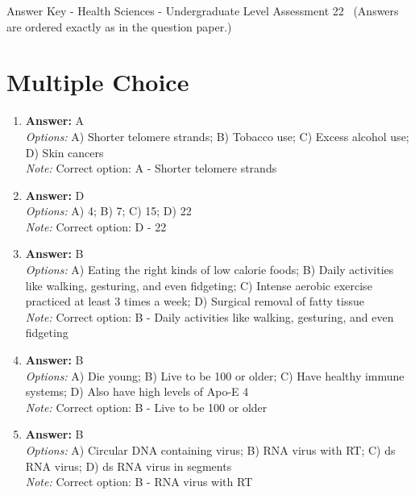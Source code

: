 \documentclass[12pt]{article}
\begin{document}
\begin{center}
Answer Key - Health Sciences - Undergraduate Level Assessment 22 \
\small (Answers are ordered exactly as in the question paper.)
\end{center}

\section*{Multiple Choice}
\begin{enumerate}[label=\arabic*.]
\item \textbf{Answer:} A
\\ \textit{Options:} A) Shorter telomere strands; B) Tobacco use; C) Excess alcohol use; D) Skin cancers
\\ \textit{Note:} Correct option: A - Shorter telomere strands
\item \textbf{Answer:} D
\\ \textit{Options:} A) 4; B) 7; C) 15; D) 22
\\ \textit{Note:} Correct option: D - 22
\item \textbf{Answer:} B
\\ \textit{Options:} A) Eating the right kinds of low calorie foods; B) Daily activities like walking, gesturing, and even fidgeting; C) Intense aerobic exercise practiced at least 3 times a week; D) Surgical removal of fatty tissue
\\ \textit{Note:} Correct option: B - Daily activities like walking, gesturing, and even fidgeting
\item \textbf{Answer:} B
\\ \textit{Options:} A) Die young; B) Live to be 100 or older; C) Have healthy immune systems; D) Also have high levels of Apo-E 4
\\ \textit{Note:} Correct option: B - Live to be 100 or older
\item \textbf{Answer:} B
\\ \textit{Options:} A) Circular DNA containing virus; B) RNA virus with RT; C) ds RNA virus; D) ds RNA virus in segments
\\ \textit{Note:} Correct option: B - RNA virus with RT
\end{enumerate}
\end{document}
